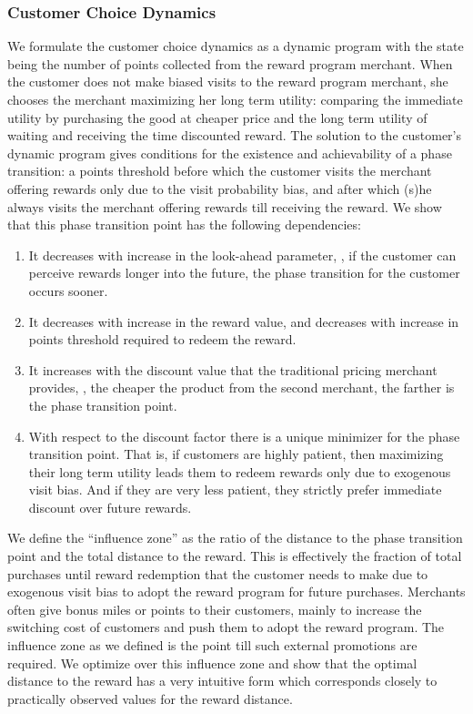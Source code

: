 \subsubsection{Customer Choice Dynamics}
We formulate the customer choice dynamics as a dynamic program with the state being the number of points collected from the reward program merchant.
When the customer does not make biased visits to the reward program merchant, she chooses the merchant maximizing her long term utility: comparing the immediate utility by purchasing the good at cheaper price and the long term utility of waiting and receiving the time discounted reward.
The solution to the customer's dynamic program gives conditions for the existence and achievability of a phase transition: a points threshold before which the customer visits the merchant offering rewards only due to the visit probability bias, and after which (s)he always visits the merchant offering rewards till receiving the reward.
We show that this phase transition point has the following dependencies:
\begin{enumerate}
\item It decreases with increase in the look-ahead parameter, \ie, if the customer can perceive rewards longer into the future, the phase transition for the customer occurs sooner.
\item It decreases with increase in the reward value, and decreases with increase in points threshold required to redeem the reward. 
\item It increases with the discount value that the traditional pricing merchant provides, \ie, the cheaper the product from the second merchant, the farther is the phase transition point. 
\item With respect to the discount factor there is a unique minimizer for the phase transition point. That is, if customers are highly patient, then maximizing their long term utility leads them to redeem rewards only due to exogenous visit bias.
And if they are very less patient, they strictly prefer immediate discount over future rewards.
\end{enumerate}

We define the ``influence zone'' as the ratio of the distance to the phase transition  point and the total distance to the reward.
This is effectively the fraction of total purchases until reward redemption that the customer needs to make due to exogenous visit bias to adopt the reward program for future purchases.
Merchants often give bonus miles or points to their customers, mainly to increase the switching cost of customers and push them to adopt the reward program.
The influence zone as we defined is the point till such external promotions are required.
We optimize over this influence zone and show that the optimal distance to the reward has a very intuitive form which corresponds closely to practically observed values for the reward distance.

